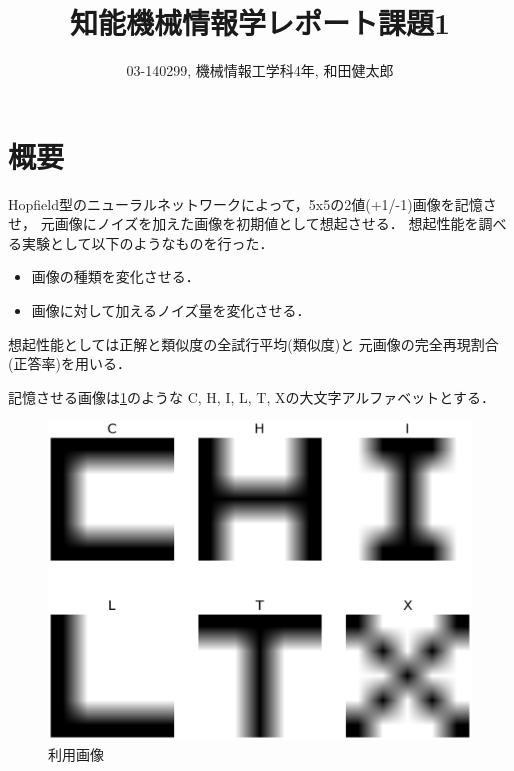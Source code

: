 \documentclass[10pt,twocolumn]{jarticle}
\title{知能機械情報学レポート課題1}
\author{03-140299, 機械情報工学科4年, 和田健太郎}
\newcommand{\figref}[1]{\figurename\ref{fig:#1}}
\begin{document}
\maketitle


\section{概要}
Hopfield型のニューラルネットワークによって，5x5の2値(+1/-1)画像を記憶させ，
元画像にノイズを加えた画像を初期値として想起させる．
想起性能を調べる実験として以下のようなものを行った．
\begin{itemize}
  \item 画像の種類を変化させる．
  \item 画像に対して加えるノイズ量を変化させる．
\end{itemize}

想起性能としては正解と類似度の全試行平均(類似度)と
元画像の完全再現割合(正答率)を用いる．

記憶させる画像は\figref{original-images}のような
C, H, I, L, T, Xの大文字アルファベットとする．
\begin{figure}[htbp]
  \centering
    \includegraphics[width=\columnwidth]{figs/alphabet_images}
    \caption{利用画像}
  \label{fig:original-images}
\end{figure}


\end{document}
